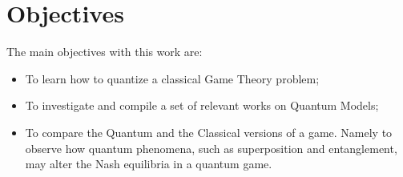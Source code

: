 \section{Objectives}
\label{sec:int_objectives}

The main objectives with this work are: 

\begin{itemize}
\item To learn how to quantize a classical Game Theory problem;

\item To investigate and compile a set of relevant works on Quantum Models;

\item To compare the Quantum and the Classical versions of a game. Namely to observe how quantum phenomena, such as superposition and entanglement, may alter the Nash equilibria in a quantum game.

\end{itemize}